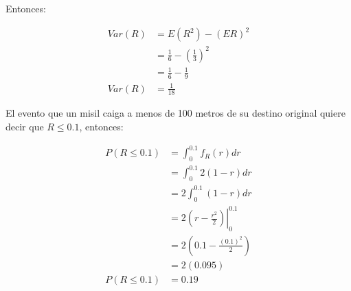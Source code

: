 Entonces:

\begin{align*}
    Var(R) & = E(R^2) -(ER)^2                           \\
           & = \frac{1}{6} - \left(\frac{1}{3}\right)^2 \\
           & = \frac{1}{6} - \frac{1}{9}                \\
    Var(R) & = \frac{1}{18}
\end{align*}

El evento que un misil caiga a menos de 100 metros de su destino original quiere decir que $R\leq 0.1$, entonces:

\begin{align*}
    P(R\leq 0.1) & = \int_0^{0.1} f_R(r) dr                               \\
             & = \int_0^{0.1} 2(1-r) dr                               \\
             & = 2 \int_0^{0.1} (1-r) dr                              \\
             & = 2  \left.\left(r-\frac{r^2}{2}\right)\right|_0^{0.1} \\
             & = 2 \left(0.1-\frac{(0.1)^2}{2}\right)                 \\
             & = 2 (0.095)                                            \\
    P(R\leq 0.1) & = 0.19
\end{align*}
